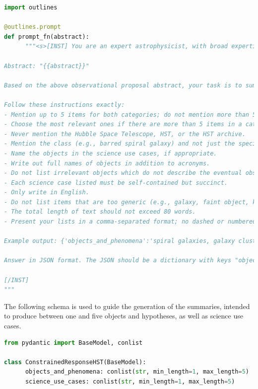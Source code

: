 \documentclass[10pt]{article} %
\begin{document}
\begin{lstlisting}[language=Python]
import outlines 

@outlines.prompt
def prompt_fn(abstract):
      """<s>[INST] You are an expert astrophysicist, with broad expertise across observational and theoretical astrophysics. You are able to extract core information from astrophysical texts.

Abstract: "{{abstract}}"

Based on the above observational proposal abstract, your task is to summarize the nature of the eventual observations. You will identify the astrophysical objects and phenomena, as well as the potential science use cases described in the abstract.

Follow these instructions exactly:
- Mention up to 5 items for both categories; do not mention more than 5 items in either category. 
- Choose the most relevant ones if there are more than 5 items in a category.
- Never mention the Hubble Space Telescope, HST, or the HST archive.
- Mention the class (e.g., barred spiral galaxy) and not just the specific instance (e.g., Andromeda).
- Name the objects in the science use cases, if appropriate.
- Write out full names of objects in addition to acronyms.
- Do not list irrelevant objects which do not describe the eventual observation, such as units or proposal Cycle numbers. List fewer but more relevant objects, if in doubt.
- Each science case listed must be self-contained but succinct.
- Only write in English.
- Do not list items that are too generic (e.g., galaxy, faint object, kinematics)
- The total length of text should not exceed 80 words.
- Present your lists in a comma-separated format; no dashed or numbered lists.

Example output: {'objects_and_phenomena':'spiral galaxies, galaxy clusters, supernova remnants', 'science_use_cases':'model galactic structure and evolution, characterize dark matter distribution in clusters, analyze expansion rates of supernova remnants'}

Answer in JSON format. The JSON should be a dictionary with keys "objects_and_phenomena" and "science_use_cases".

[/INST]
"""
\end{lstlisting}

The following schema is used to guide the generation of the summaries, intended to produce between one and five objects and hypotheses, as well as science use cases.

\begin{lstlisting}[language=Python]
from pydantic import BaseModel, conlist

class ConstrainedResponseHST(BaseModel):
      objects_and_phenomena: conlist(str, min_length=1, max_length=5)
      science_use_cases: conlist(str, min_length=1, max_length=5)
\end{lstlisting}
\end{document}
